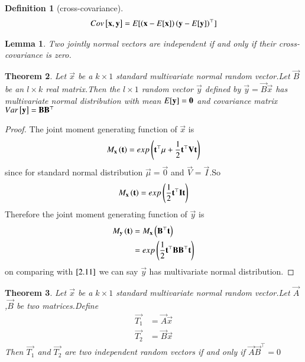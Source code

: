 \documentclass[journal,12pt,twocolumn]{IEEEtran}
\newtheorem{theorem}{Theorem}[section]
\newtheorem{lemma}[theorem]{Lemma}
\newtheorem{definition}{Definition}[section]
\begin{document}
\begin{definition}[cross-covariance]
\begin{align}
    Cov{}\left[\mathbf{x},\mathbf{y}\right]=E[ \left(\mathbf{x}-E[ \mathbf{x} ]\right)\left(\mathbf{y}-E[ \mathbf{y} ]\right)^{\top} ]
\end{align}
\end{definition}
\begin{lemma}
Two jointly normal vectors are independent if and only if their cross-covariance is zero.
\end{lemma}
\begin{theorem}
\label{t2.2}
Let $\vec{x}$ be a $k\times 1$ standard multivariate normal random vector.Let $\vec{B}$ be an $l\times k$ real matrix.Then the $l\times 1$ random vector $\vec{y}$ defined by $\vec{y}=\vec{B}\vec{x}$ has multivariate normal distribution with mean $E[ \mathbf{y} ]=\mathbf{0}$ and covariance matrix $Var{}\left[\mathbf{y}\right]=\mathbf{B}\mathbf{B}^{\top}$ 
\end{theorem}
\begin{proof}
The joint moment generating function of $\vec{x}$ is
\begin{align}
    M_{\mathbf{x}}\left(\mathbf{t}\right)=exp\left(\mathbf{t}^{\top}\mu+\frac{1}{2}\mathbf{t}^{\top}\mathbf{V}\mathbf{t}\right)
\end{align}
since for standard normal distribution $\vec{\mu}=\vec{0}$ and $\vec{V}=\vec{I}$.So
\begin{align}
     M_{\mathbf{x}}\left(\mathbf{t}\right)=exp\left(\frac{1}{2}\mathbf{t}^{\top}\mathbf{I}\mathbf{t}\right)\label{2.11}
\end{align}
Therefore the joint moment generating function of $\vec{y}$ is
\begin{align}
    M_{\mathbf{y}}\left(\mathbf{t}\right)&=M_{\mathbf{x}}\left(\mathbf{B}^{\top}\mathbf{t}\right)\\
    &=exp\left(\frac{1}{2}\mathbf{t}^{\top}\mathbf{B}\mathbf{B}^{\top}\mathbf{t}\right)
\end{align}
on comparing with $\eqref{2.11}$ we can say $\vec{y}$ has multivariate normal distribution. 
\end{proof}
\begin{theorem}
\label{t2.3}
Let $\vec{x}$ be a $k\times 1$ standard multivariate normal random vector.Let $\vec{A}$ ,$\vec{B}$ be two matrices.Define
\begin{align}
    \vec{T_1}&=\vec{A}\vec{x}\\
    \vec{T_2}&=\vec{B}\vec{x}
\end{align}
Then $\vec{T_1}$ and $\vec{T_2}$ are two independent random vectors if and only if $\vec{A}\vec{B}^{\top}=0$
\end{theorem}
\end{document}
